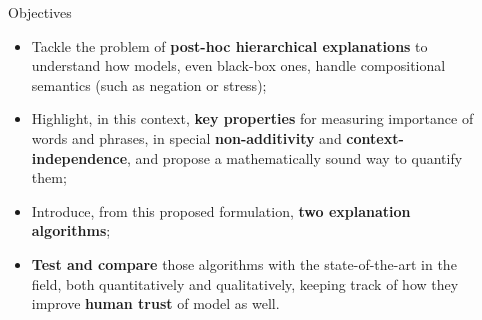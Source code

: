\documentclass[final]{beamer}
\title{Towards Hierarchical Importance Attribution: Explaining Compositional Semantics for Neural Sequence Models \texorpdfstring{\cite{jin2020towards}}} %
\author{Reviewed by Sara Amrouche, Roger Lucena and Alexandre Macedo} %
\institute{Sorbonne University, Paris VI} %
\newlength{\sepwid}
\newlength{\onecolwid}
\begin{document}

\setlength{\belowcaptionskip}{2ex} %
\setlength\belowdisplayshortskip{2ex} %

\begin{frame}[t] %
\begin{columns}[t] %

\begin{column}{\sepwid}\end{column} %

\begin{column}{\onecolwid} %

\begin{alertblock}{Objectives}

\begin{itemize}
\item Tackle the problem of \textbf{post-hoc hierarchical explanations} to understand how models, even black-box ones, handle compositional semantics (such as negation or stress);

\item Highlight, in this context, \textbf{key properties} for measuring importance of words and phrases, in special \textbf{non-additivity} and \textbf{context-independence}, and propose a mathematically sound way to quantify them;

\item Introduce, from this proposed formulation, \textbf{two explanation algorithms};

\item \textbf{Test and compare} those algorithms with the state-of-the-art in the field, both quantitatively and qualitatively, keeping track of how they improve \textbf{human trust} of model as well. 
\end{itemize}

\end{alertblock}


\end{column}
\end{columns}
\end{frame}
\end{document}
